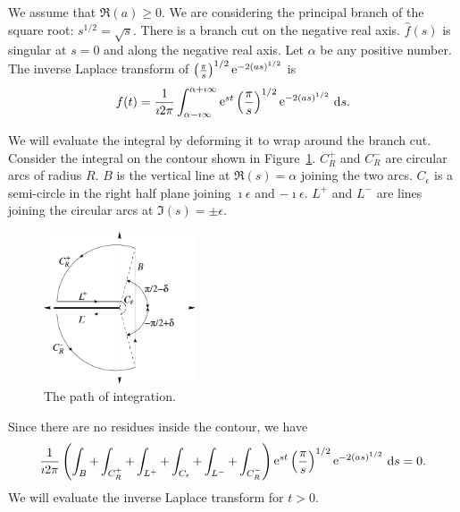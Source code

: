 {%
\begin{Solution}
  \label{solution F(s)=(pi/s)1/2 e -2(as)1/2}
  We assume that $\Re(a) \geq 0$.
  We are considering the principal branch of the square root: 
  $s^{1/2} = \sqrt{s}$.  There is a branch cut on the negative real 
  axis.  $\hat{f}(s)$ is singular at $s = 0$ and along the negative real axis.
  Let $\alpha$ be any positive number.  The inverse Laplace transform of
  $\left( \frac{\pi}{s} \right)^{1/2} \mathop{\mathrm{e}}\nolimits^{-2 (a s)^{1/2}}$ is
  \[
  f(t) = \frac{1}{\imath 2 \pi} \int_{\alpha - \imath \infty}^{\alpha + \imath \infty}
  \mathop{\mathrm{e}}\nolimits^{s t} \left( \frac{\pi}{s} \right)^{1/2} \mathop{\mathrm{e}}\nolimits^{-2 (a s)^{1/2}} \,\mathrm{d} s.
  \]

  We will evaluate the integral by deforming it to wrap around the branch
  cut.
  Consider the integral on the contour shown in Figure~\ref{pi_over_sqrt_s}.
  $C_R^+$ and $C_R^-$ are circular arcs of radius $R$.  $B$ is the vertical
  line at $\Re(s) = \alpha$ joining the two arcs.   $C_\epsilon$ is
  a semi-circle in the right half plane joining $\imath \epsilon$ and
  $-\imath \epsilon$.  $L^+$ and $L^-$ are lines joining the circular arcs at
  $\Im(s) = \pm \epsilon$.

  \begin{figure}[h!]
    \begin{center}
      \includegraphics[width=0.4\textwidth]{ode/laplace/sqrts}
    \end{center}
    \caption{The path of integration.}
    \label{pi_over_sqrt_s}
  \end{figure}

  Since there are no residues inside the contour, we have
  \[
  \frac{1}{\imath 2 \pi} \left( \int_B + \int_{C_R^+} + \int_{L^+}
    + \int_{C_\epsilon} + \int_{L^-} + \int_{C_R^-} \right)
  \mathop{\mathrm{e}}\nolimits^{s t} \left( \frac{\pi}{s} \right)^{1/2} \mathop{\mathrm{e}}\nolimits^{-2 (a s)^{1/2}} \,\mathrm{d} s = 0.
  \]
  We will evaluate the inverse Laplace transform for $t>0$.



\end{Solution}}
